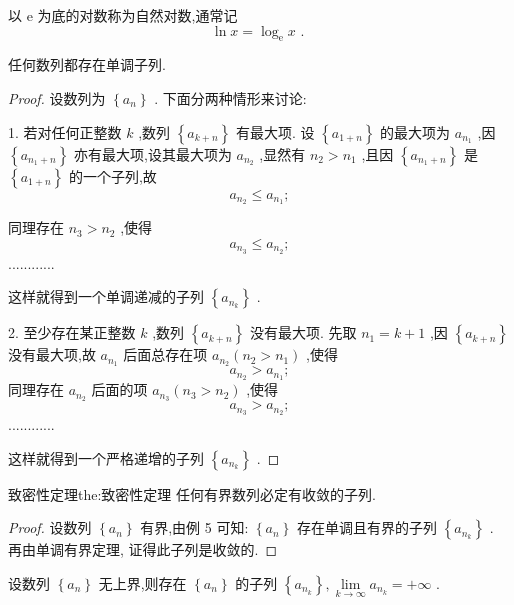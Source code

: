 以 \(\mathrm{e}\) 为底的对数称为自然对数,通常记
\[
\ln x = {\log }_{\mathrm{e}}x\text{ . }
\]

\begin{example}
任何数列都存在单调子列.
\end{example}


\begin{proof}
设数列为 \(\left\{  {a}_{n}\right\}\) . 下面分两种情形来讨论:

1. 若对任何正整数 \(k\) ,数列 \(\left\{  {a}_{k + n}\right\}\) 有最大项. 设 \(\left\{  {a}_{1 + n}\right\}\) 的最大项为 \({a}_{{n}_{1}}\) ,因 \(\left\{  {a}_{{n}_{1} + n}\right\}\) 亦有最大项,设其最大项为 \({a}_{{n}_{2}}\) ,显然有 \({n}_{2} > {n}_{1}\) ,且因 \(\left\{  {a}_{{n}_{1} + n}\right\}\) 是 \(\left\{  {a}_{1 + n}\right\}\) 的一个子列,故
\[
{a}_{{n}_{2}} \leq  {a}_{{n}_{1}};
\]

同理存在 \({n}_{3} > {n}_{2}\) ,使得
\[
{a}_{{n}_{3}} \leq  {a}_{{n}_{2}};
\]
............

这样就得到一个单调递减的子列 \(\left\{  {a}_{{n}_{k}}\right\}\) .

2. 至少存在某正整数 \(k\) ,数列 \(\left\{  {a}_{k + n}\right\}\) 没有最大项. 先取 \({n}_{1} = k + 1\) ,因 \(\left\{  {a}_{k + n}\right\}\) 没有最大项,故 \({a}_{{n}_{1}}\) 后面总存在项 \({a}_{{n}_{2}}\left( {{n}_{2} > {n}_{1}}\right)\) ,使得
\[
{a}_{{n}_{2}} > {a}_{{n}_{1}};
\]
同理存在 \({a}_{{n}_{2}}\) 后面的项 \({a}_{{n}_{3}}\left( {{n}_{3} > {n}_{2}}\right)\) ,使得
\[
{a}_{{n}_{3}} > {a}_{{n}_{2}};
\]
............

这样就得到一个严格递增的子列 \(\left\{  {a}_{{n}_{k}}\right\}\) .
\end{proof}


\begin{theorem}{致密性定理}{the:致密性定理}
任何有界数列必定有收敛的子列.
\end{theorem}

\begin{proof}
设数列 \(\left\{  {a}_{n}\right\}\) 有界,由例 5 可知: \(\left\{  {a}_{n}\right\}\) 存在单调且有界的子列 \(\left\{  {a}_{{n}_{k}}\right\}\) . 再由单调有界定理, 证得此子列是收敛的.
\end{proof}


\begin{example}
设数列 \(\left\{  {a}_{n}\right\}\) 无上界,则存在 \(\left\{  {a}_{n}\right\}\) 的子列 \(\left\{  {a}_{{n}_{k}}\right\}  ,\mathop{\lim }\limits_{{k \rightarrow  \infty }}{a}_{{n}_{k}} =  + \infty\) .
\end{example}


